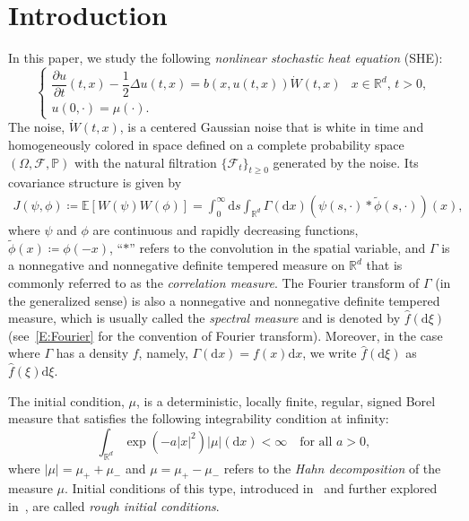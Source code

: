 \documentclass[sn-mathphys]{sn-jnl}%
\newcommand{\BR}{\mathbb{R}}
\newcommand{\E}{\mathbb{E}}
\newcommand{\ud}{\ensuremath{\mathrm{d}}}
\numberwithin{equation}{section}
\theoremstyle{thmstyleone}%
\theoremstyle{thmstyletwo}%
\theoremstyle{thmstylethree}%
\begin{document}
\maketitle

\section{Introduction}
In this paper, we study the following \textit{nonlinear stochastic heat equation} (SHE):
\begin{equation}\label{E:SHE}
    \begin{cases}
     \dfrac{\partial u}{\partial t}(t,x)-\dfrac{1}{2}\Delta u(t,x) = b(x,u(t,x))\dot W(t,x) & \text{$x\in \BR^d$, $t>0$}, \\
     u(0,\cdot) = \mu(\cdot).
   \end{cases}
\end{equation}
The noise, $\dot{W}(t,x)$, is a centered Gaussian noise that is white in time and homogeneously
colored in space defined on a complete probability space $(\Omega, \mathcal{F}, \mathbb{P})$ with
the natural filtration $\{\mathcal{F}_t \}_{t\ge 0}$ generated by the noise. Its covariance
structure is given by
\begin{align}\label{E:Cor}
  J(\psi,\phi) \coloneqq \E \left[ W\left(\psi\right) W\left(\phi\right) \right]
  = \int_0^\infty \ud s \int_{\BR^d} \Gamma(\ud x)(\psi(s,\cdot)*\widetilde{\phi}(s,\cdot))(x),
\end{align}
where $\psi$ and $\phi$ are continuous and rapidly decreasing functions, $\widetilde{\phi}(x)
\coloneqq \phi(-x)$, ``$*$'' refers to the convolution in the spatial variable, and $\Gamma$ is a
nonnegative and nonnegative definite tempered measure on $\BR^d$ that is commonly referred to as the
\textit{correlation measure}. The Fourier transform of $\Gamma$ (in the generalized sense) is also a
nonnegative and nonnegative definite tempered measure, which is usually called the \textit{spectral
measure} and is denoted by $\widehat{f}(\ud \xi)$ (see~\eqref{E:Fourier} for the convention of
Fourier transform). Moreover, in the case where $\Gamma$ has a density $f$, namely, $\Gamma(\ud x) =
f(x) \ud x$, we write $\widehat{f}(\ud \xi)$ as $\widehat{f}(\xi) \ud \xi$.

The initial condition, $\mu$, is a deterministic, locally finite, regular, signed Borel measure that
satisfies the following integrability condition at infinity:
\begin{equation}\label{A:icon}
  \int_{\BR^d}\exp\left(-a\lvert x\rvert^2\right) \lvert \mu\rvert(\ud x) < \infty \quad \text{for all $a>0$},
\end{equation}
where $\lvert\mu\rvert = \mu_+ + \mu_-$ and $\mu = \mu_+-\mu_-$ refers to the \textit{Hahn
decomposition} of the measure $\mu$. Initial conditions of this type, introduced
in~\cite{chen.dalang:15:moments*1} and further explored
in~\cite{chen.kim:19:nonlinear,chen.huang:19:comparison}, are called \textit{rough initial
conditions}.
\end{document}
